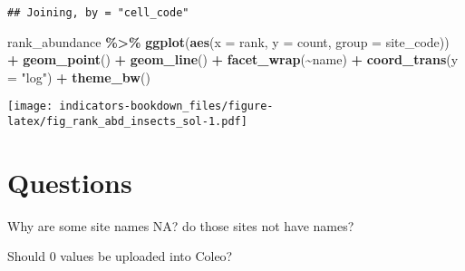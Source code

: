 \documentclass[
]{book}
\newenvironment{Shaded}{\begin{snugshade}}{\end{snugshade}}
\newcommand{\DataTypeTok}[1]{\textcolor[rgb]{0.13,0.29,0.53}{#1}}
\newcommand{\KeywordTok}[1]{\textcolor[rgb]{0.13,0.29,0.53}{\textbf{#1}}}
\newcommand{\NormalTok}[1]{#1}
\newcommand{\OperatorTok}[1]{\textcolor[rgb]{0.81,0.36,0.00}{\textbf{#1}}}
\newcommand{\StringTok}[1]{\textcolor[rgb]{0.31,0.60,0.02}{#1}}
\begin{document}
\begin{verbatim}
## Joining, by = "cell_code"
\end{verbatim}

\begin{Shaded}
\begin{Highlighting}[]
\NormalTok{rank\_abundance }\OperatorTok{\%\textgreater{}\%}\StringTok{ }
\StringTok{  }\KeywordTok{ggplot}\NormalTok{(}\KeywordTok{aes}\NormalTok{(}\DataTypeTok{x =}\NormalTok{ rank, }\DataTypeTok{y =}\NormalTok{ count, }\DataTypeTok{group =}\NormalTok{ site\_code)) }\OperatorTok{+}\StringTok{ }
\StringTok{  }\KeywordTok{geom\_point}\NormalTok{() }\OperatorTok{+}\StringTok{ }
\StringTok{  }\KeywordTok{geom\_line}\NormalTok{() }\OperatorTok{+}\StringTok{ }
\StringTok{  }\KeywordTok{facet\_wrap}\NormalTok{(}\OperatorTok{\textasciitilde{}}\NormalTok{name) }\OperatorTok{+}\StringTok{ }
\StringTok{  }\KeywordTok{coord\_trans}\NormalTok{(}\DataTypeTok{y =} \StringTok{"log"}\NormalTok{) }\OperatorTok{+}\StringTok{ }
\StringTok{  }\KeywordTok{theme\_bw}\NormalTok{()}
\end{Highlighting}
\end{Shaded}

\texttt{[image: indicators-bookdown\_files/figure-latex/fig\_rank\_abd\_insects\_sol-1.pdf]}

\hypertarget{questions-1}{%
\section{Questions}\label{questions-1}}

Why are some site names NA? do those sites not have names?

Should 0 values be uploaded into Coleo?

  
\end{document}

